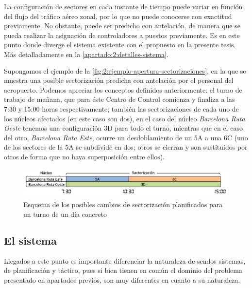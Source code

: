 La configuración de sectores en cada instante de tiempo puede variar en función del flujo del tráfico aéreo zonal, por lo que no puede conocerse con exactitud previamente. No obstante, puede ser predicho con antelación, de manera que se pueda realizar la asignación de controladores a puestos previamente.
Es en este punto donde diverge el sistema existente con el propuesto en la presente tesis. 
Más detalladamente en la \autoref{apartado:2:detalles-sistema}.

Supongamos el ejemplo de la \autoref{fig:2:ejemplo-apertura-sectorizaciones}, en la que se muestra una posible sectorización predicha con antelación por el personal del aeropuerto. Podemos apreciar los conceptos definidos anteriormente: el turno de trabajo de mañana, que para éste \gls{Centro de Control} comienza y finaliza a las 7:30 y 15:00 horas respectivamente; también las sectorizaciones de cada uno de los núcleos afectados (en este caso son dos), en el caso del núcleo \textit{Barcelona Ruta Oeste} tenemos una configuración 3D para todo el turno, mientras que en el caso del otro, \textit{Barcelona Ruta Este}, ocurre un desdoblamiento de un 5A a una 6C (uno de los sectores de la 5A se subdivide en dos; otros se cierran y son sustituidos por otros de forma que no haya superposición entre ellos).

\begin{figure}[htbp]
	\centering
	\includegraphics[width=\linewidth]{ejemplo-apertura-sectorizaciones}
	\caption[Posibles cambios de sectorización planificados para un turno]{Esquema de los posibles cambios de 
	sectorización planificados para un turno de un día concreto}
	\label{fig:2:ejemplo-apertura-sectorizaciones}
\end{figure}

\subsection{El sistema \legacy{}}
\label{apartado:2:detalles-sistema}
Llegados a este punto es importante diferenciar la naturaleza de sendos sistemas, de planificación y táctico, pues si bien tienen en común el dominio del problema presentado en apartados previos, son muy diferentes en cuanto a su naturaleza.

